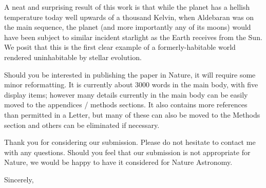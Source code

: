 \documentclass{letter}
\begin{document}
\begin{letter}
A neat and surprising result of this work is that while the planet has a hellish
temperature today well upwards of a thousand Kelvin, when Aldebaran was on the
main sequence, the planet (and more importantly any of its moons) would have
been subject to similar incident starlight as the Earth receives from the Sun.
We posit that this is the first clear example of a formerly-habitable world
rendered uninhabitable by stellar evolution.

Should you be interested in publishing the paper in Nature, it will require some
minor reformatting.  It is currently about 3000 words in the main body, with
five display items; however many details currently in the main body can be
easily moved to the appendices / methods sections.  It also contains more
references than permitted in a Letter, but many of these can also be moved to
the Methods section and others can be eliminated if necessary.

Thank you for considering our submission. Please do not hesitate to contact me
with any questions.  Should you feel that our submission is not appropriate for
Nature, we would be happy to have it considered for Nature Astronomy.

\closing{Sincerely,}

\end{letter}
\end{document}
